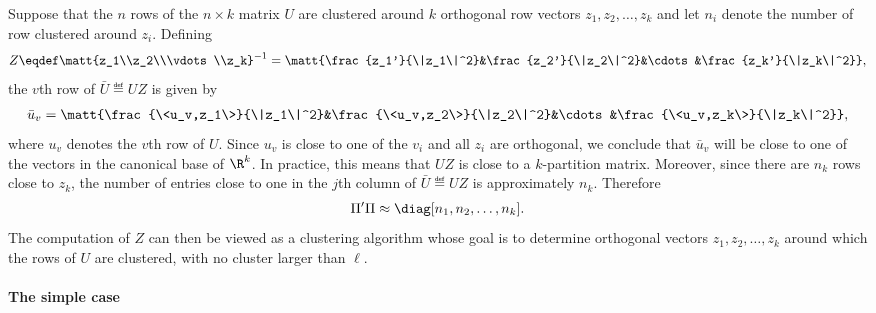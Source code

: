 \documentclass[10pt]{article}
\begin{document}
Suppose that the $n$ rows of the $n\times k$ matrix $U$ are clustered
around $k$ orthogonal row vectors $z_1,z_2,\dots,z_k$ and let $n_i$
denote the number of row clustered around $z_i$. Defining
\begin{align*}
  Z\eqdef \matt{z_1\\z_2\\\vdots\\z_k}^{-1}
  =\matt{\frac{z_1'}{\|z_1\|^2}&\frac{z_2'}{\|z_2\|^2}&\cdots&\frac{z_k'}{\|z_k\|^2}},
\end{align*}
the $v$th row of $\bar U\eqdef U Z$ is given by
\begin{align*}
  \bar u_v = \matt{\frac{\<u_v,z_1\>}{\|z_1\|^2}&\frac{\<u_v,z_2\>}{\|z_2\|^2}&\cdots&\frac{\<u_v,z_k\>}{\|z_k\|^2}},
\end{align*}
where $u_v$ denotes the $v$th row of $U$. Since $u_v$ is close to one
of the $v_i$ and all $z_i$ are orthogonal, we conclude that $\bar u_v$
will be close to one of the vectors in the canonical base of $\R^k$.
In practice, this means that $U Z$ is close to a $k$-partition matrix.
Moreover, since there are $n_k$ rows close to $z_k$, the number of
entries close to one in the $j$th column of $\bar U\eqdef U Z$ is
approximately $n_k$. Therefore
\begin{align*}
  \Pi'\Pi \approx \diag[n_1,n_2,\dots,n_k].
\end{align*}
The computation of $Z$ can then be viewed as a clustering algorithm
whose goal is to determine orthogonal vectors $z_1,z_2,\dots,z_k$
around which the rows of $U$ are clustered, with no cluster larger
than $\ell$.


\paragraph{The simple case}
\end{document}

